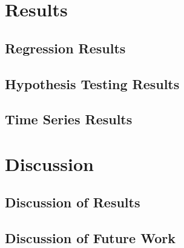 \documentclass[11pt]{article}
\begin{document}
		
		
\section{Results}
		
	\subsection{Regression Results}
	
		
		
		
	\subsection{Hypothesis Testing Results}
	
		
		
	\subsection{Time Series Results}
	
		
		
\section{Discussion}
	
	\subsection{Discussion of Results}
		
		
		
	\subsection{Discussion of Future Work}
	
		
		


\end{document}
